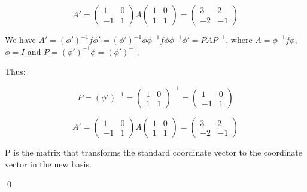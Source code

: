 \documentclass[12pt]{article}
\begin{document}
\begin{equation}
    A' =
    \begin{pmatrix}
        1  & 0 \\
        -1 & 1
    \end{pmatrix}
    A
    \begin{pmatrix}
        1 & 0 \\
        1 & 1
    \end{pmatrix}
    =
    \begin{pmatrix}
        3  & 2  \\
        -2 & -1
    \end{pmatrix}
\end{equation}

\begin{correction}
    We have $A' = (\phi')^{-1} f \phi' = (\phi')^{-1} \phi \phi^{-1} f \phi \phi^{-1} \phi' = PAP^{-1}$, where $A = \phi^{-1} f \phi$, $\phi = I$ and $P = (\phi')^{-1} \phi = (\phi')^{-1}$.

    Thus:

    \begin{equation}
        P = (\phi')^{-1} =
        \begin{pmatrix}
            1 & 0 \\
            1 & 1
        \end{pmatrix}^{-1}
        =
        \begin{pmatrix}
            1  & 0 \\
            -1 & 1
        \end{pmatrix}
    \end{equation}

    \begin{equation}
        A' =
        \begin{pmatrix}
            1  & 0 \\
            -1 & 1
        \end{pmatrix}
        A
        \begin{pmatrix}
            1 & 0 \\
            1 & 1
        \end{pmatrix}
        =
        \begin{pmatrix}
            3  & 2  \\
            -2 & -1
        \end{pmatrix}
    \end{equation}

    P is the matrix that transforms the standard coordinate vector to the coordinate vector in the new basis.
\end{correction}
\qed
\end{document}
